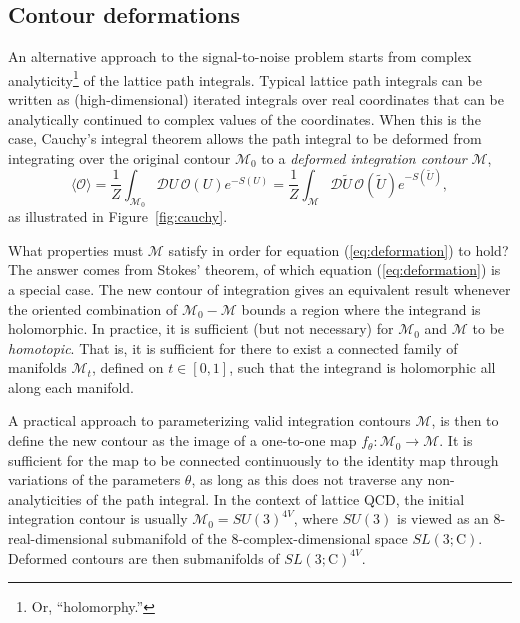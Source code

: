 \documentclass[12pt]{article}
\begin{document}
\subsection{Contour deformations}
An alternative approach to the signal-to-noise problem starts from complex analyticity\footnote{Or, ``holomorphy.''} of the lattice path integrals. Typical lattice path integrals can be written as (high-dimensional) iterated integrals over real coordinates that can be analytically continued to complex values of the coordinates. When this is the case, Cauchy's integral theorem allows the path integral to be deformed from integrating over the original contour $\mathcal{M}_0$ to a \emph{deformed integration contour} $\mathcal{M}$,
\begin{equation}\label{eq:deformation}
    \langle \mathcal{O} \rangle = \frac{1}{Z} \int_{\mathcal{M}_0} \mathcal{D}U\, \mathcal{O}(U) e^{-S(U)} = \frac{1}{Z} \int_{\mathcal{M}} \mathcal{D}\tilde{U}\, \mathcal{O}(\tilde{U}) e^{-S(\tilde{U})},
\end{equation}
as illustrated in Figure~\ref{fig:cauchy}.

What properties must $\mathcal M$ satisfy in order for equation (\ref{eq:deformation}) to hold? The answer comes from Stokes' theorem, of which equation (\ref{eq:deformation}) is a special case.
The new contour of integration gives an equivalent result whenever the oriented combination of $\mathcal{M}_0 - \mathcal{M}$ bounds a region where the integrand is holomorphic.
In practice, it is sufficient (but not necessary) for $\mathcal M_0$ and $\mathcal M$ to be \emph{homotopic}. That is, it is sufficient for there to exist a connected family of manifolds $\mathcal M_t$, defined on $t \in [0,1]$, such that the integrand is holomorphic all along each manifold.

A practical approach to parameterizing valid integration contours $\mathcal{M}$, is then to define the new contour as the image of a one-to-one map $f_\theta: \mathcal{M}_0 \to \mathcal{M}$. It is sufficient for the map to be connected continuously to the identity map through variations of the parameters $\theta$, as long as this does not traverse any non-analyticities of the path integral. In the context of lattice QCD, the initial integration contour is usually $\mathcal{M}_0 = SU(3)^{4V}$, where $SU(3)$ is viewed as an 8-real-dimensional submanifold of the 8-complex-dimensional space $SL(3;\mathrm C)$. Deformed contours are then submanifolds of $SL(3;\mathrm C)^{4V}$.
\end{document}
